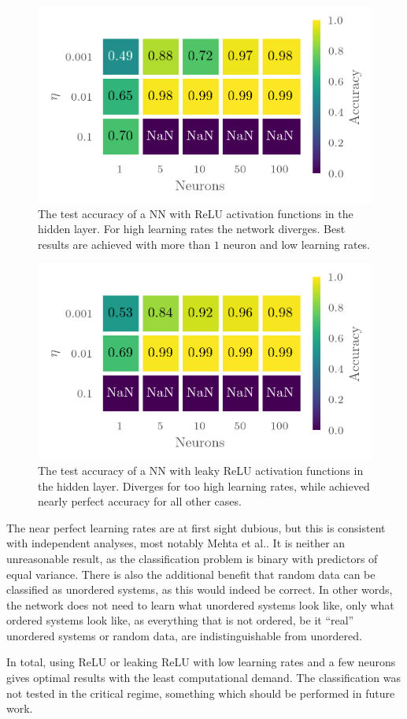 \begin{figure}[H]
  \centering
  \includegraphics[]{figures/relugrid.png}
  \caption{\label{fig:relu_grid} The test accuracy of a NN with ReLU activation
  functions in the hidden layer. For high learning rates the network diverges.
  Best results are achieved with more than \(1\) neuron and low learning rates.}
\end{figure}

\begin{figure}[H]
  \centering
  \includegraphics[]{figures/leakygrid.png}
  \caption{\label{fig:leaky_grid} The test accuracy of a NN with leaky ReLU
    activation functions in the hidden layer. Diverges for too high learning
    rates, while achieved nearly perfect accuracy for all other cases.}
\end{figure}

The near perfect learning rates are at first sight dubious, but this is
consistent with independent analyses, most notably Mehta et al.\cite{mehta}. It
is neither an unreasonable result, as the classification problem is binary with
predictors of equal variance. There is also the additional benefit that random
data can be classified as unordered systems, as this would indeed be correct. In
other words, the network does not need to learn what unordered systems look
like, only what ordered systems look like, as everything that is not ordered, be
it ``real'' unordered systems or random data, are indistinguishable from unordered.

In total, using ReLU or leaking ReLU with low learning rates and a few neurons
gives optimal results with the least computational demand. The classification
was not tested in the critical regime, something which should be performed in
future work. 
